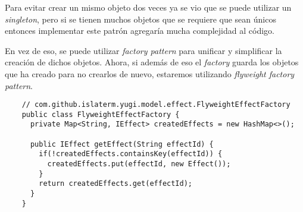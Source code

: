 \begin{Answer}[ref={ex:flyweight-1}]
  Para evitar crear un mismo objeto dos veces ya se vio que se puede utilizar un 
  \textit{singleton}, pero si se tienen muchos objetos que se requiere que sean únicos
  entonces implementar este patrón agregaría mucha complejidad al código.
  
  En vez de eso, se puede utilizar \textit{factory pattern} para unificar y simplificar la
  creación de dichos objetos.
  Ahora, si además de eso el \textit{factory} guarda los objetos que ha creado para no 
  crearlos de nuevo, estaremos utilizando \textit{flyweight factory pattern}.

  \begin{verbatim}
    // com.github.islaterm.yugi.model.effect.FlyweightEffectFactory
    public class FlyweightEffectFactory {
      private Map<String, IEffect> createdEffects = new HashMap<>();

      public IEffect getEffect(String effectId) {
        if(!createdEffects.containsKey(effectId)) {
          createdEffects.put(effectId, new Effect());
        }
        return createdEffects.get(effectId);
      }
    }
  \end{verbatim}
\end{Answer}